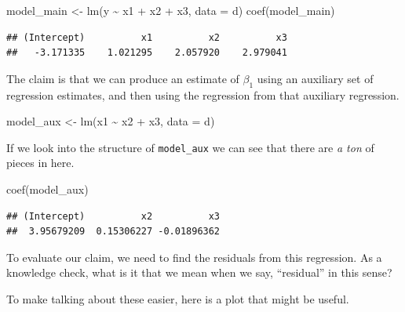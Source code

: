\documentclass[
]{book}
\newenvironment{Shaded}{\begin{snugshade}}{\end{snugshade}}
\newcommand{\AttributeTok}[1]{\textcolor[rgb]{0.77,0.63,0.00}{#1}}
\newcommand{\FunctionTok}[1]{\textcolor[rgb]{0.00,0.00,0.00}{#1}}
\newcommand{\NormalTok}[1]{#1}
\newcommand{\OtherTok}[1]{\textcolor[rgb]{0.56,0.35,0.01}{#1}}
\newcommand{\SpecialCharTok}[1]{\textcolor[rgb]{0.00,0.00,0.00}{#1}}
\theoremstyle{definition}
\theoremstyle{definition}
\theoremstyle{definition}
\theoremstyle{definition}
\theoremstyle{remark}
\begin{document}
\begin{Shaded}
\begin{Highlighting}[]
\NormalTok{model\_main }\OtherTok{\textless{}{-}} \FunctionTok{lm}\NormalTok{(y }\SpecialCharTok{\textasciitilde{}}\NormalTok{ x1 }\SpecialCharTok{+}\NormalTok{ x2 }\SpecialCharTok{+}\NormalTok{ x3, }\AttributeTok{data =}\NormalTok{ d)}
\FunctionTok{coef}\NormalTok{(model\_main)}
\end{Highlighting}
\end{Shaded}

\begin{verbatim}
## (Intercept)          x1          x2          x3 
##   -3.171335    1.021295    2.057920    2.979041
\end{verbatim}

The claim is that we can produce an estimate of \(\beta_1\) using an auxiliary set of regression estimates, and then using the regression from that auxiliary regression.

\begin{Shaded}
\begin{Highlighting}[]
\NormalTok{model\_aux }\OtherTok{\textless{}{-}} \FunctionTok{lm}\NormalTok{(x1 }\SpecialCharTok{\textasciitilde{}}\NormalTok{ x2 }\SpecialCharTok{+}\NormalTok{ x3, }\AttributeTok{data =}\NormalTok{ d)}
\end{Highlighting}
\end{Shaded}

If we look into the structure of \texttt{model\_aux} we can see that there are \emph{a ton} of pieces in here.

\begin{Shaded}
\begin{Highlighting}[]
\FunctionTok{coef}\NormalTok{(model\_aux)}
\end{Highlighting}
\end{Shaded}

\begin{verbatim}
## (Intercept)          x2          x3 
##  3.95679209  0.15306227 -0.01896362
\end{verbatim}

To evaluate our claim, we need to find the residuals from this regression. As a knowledge check, what is it that we mean when we say, ``residual'' in this sense?

To make talking about these easier, here is a plot that might be useful.
\end{document}
